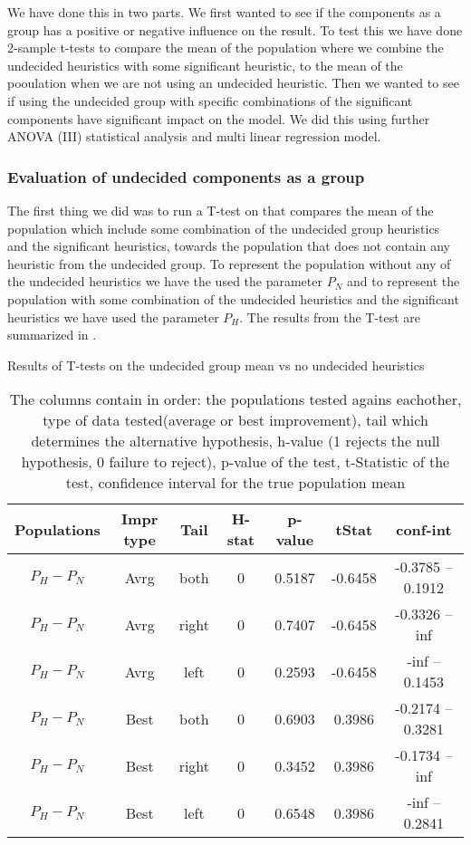 \documentclass[../main.tex]{subfiles}
\begin{document}
We have done this in two parts.
We first wanted to see if the components as a group has a positive or negative influence on the result. 
To test this we have done 2-sample t-tests to compare the mean of the population where we combine the undecided heuristics with some significant heuristic, to the mean of the pooulation when we are not using an undecided heuristic. 
Then we wanted to see if using the undecided group with specific combinations of the significant components have significant impact on the model. 
We did this using further ANOVA (III) statistical analysis and multi linear regression model.

\subsubsection{Evaluation of undecided components as a group}
The first thing we did was to run a T-test on that compares the mean of the population which include some combination of the undecided group heuristics and the significant heuristics, towards the population that does not contain any heuristic from the undecided group. 
To represent the population without any of the undecided heuristics we have the used the parameter $P_N$ and to represent the population with some combination of the undecided heuristics and the significant heuristics we have used the parameter $P_H$.
The results from the T-test are summarized in .

\begin{table}
    \centering
    \caption{Results of T-tests on the undecided group mean vs no undecided heuristics}
        \begin{tabular}{ccccccc}
        \hline
            Populations    & Impr type & Tail   &H-stat   & p-value    & tStat & conf-int \\ 
        \hline                
        $P_H-P_N$   & Avrg  & both  & 0 & 0.5187    & -0.6458   & -0.3785 -- 0.1912\\
        $P_H-P_N$   & Avrg  & right & 0 & 0.7407    & -0.6458   & -0.3326 -- inf   \\
        $P_H-P_N$   & Avrg  & left  & 0 & 0.2593    & -0.6458   & -inf -- 0.1453   \\
        $P_H-P_N$   & Best  & both  & 0 & 0.6903    & 0.3986    & -0.2174 -- 0.3281 \\
        $P_H-P_N$   & Best  & right & 0 & 0.3452    & 0.3986    & -0.1734 -- inf    \\
        $P_H-P_N$   & Best  & left  & 0 & 0.6548    & 0.3986    & -inf -- 0.2841    \\
       \hline
        \end{tabular}
    \caption*{The columns contain in order: the populations tested agains eachother, type of data tested(average or best improvement), tail which determines the alternative hypothesis, h-value (1 rejects the null hypothesis, 0 failure to reject), p-value of the test, t-Statistic of the test, confidence interval for the true population mean}
   \label{tab:tTestGroup}
\end{table}
\end{document}
